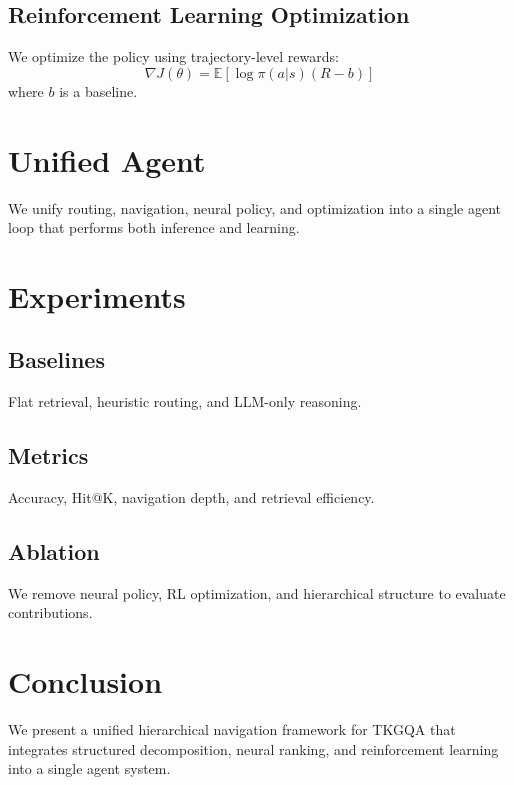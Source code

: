 \documentclass{article}
\begin{document}
\subsection{Reinforcement Learning Optimization}
We optimize the policy using trajectory-level rewards:
\begin{equation}
\nabla J(\theta) = \mathbb{E}[\log \pi(a|s)(R - b)]
\end{equation}
where $b$ is a baseline.

\section{Unified Agent}
We unify routing, navigation, neural policy, and optimization into a single agent loop that performs both inference and learning.

\section{Experiments}

\subsection{Baselines}
Flat retrieval, heuristic routing, and LLM-only reasoning.

\subsection{Metrics}
Accuracy, Hit@K, navigation depth, and retrieval efficiency.

\subsection{Ablation}
We remove neural policy, RL optimization, and hierarchical structure to evaluate contributions.

\section{Conclusion}
We present a unified hierarchical navigation framework for TKGQA that integrates structured decomposition, neural ranking, and reinforcement learning into a single agent system.
\end{document}
